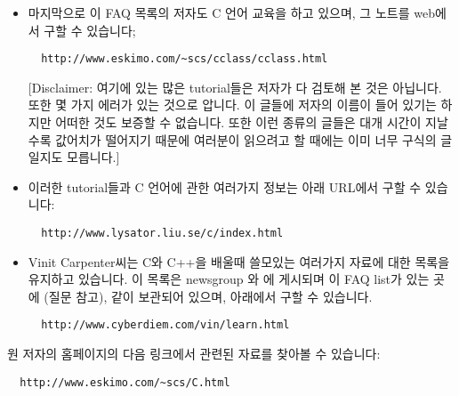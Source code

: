 \begin{faq}
\begin{itemize}
	\item 마지막으로 이 FAQ 목록의 저자도 C 언어 교육을 하고 있으며,
	그 노트를 web에서 구할 수 있습니다;
\begin{verbatim}
  http://www.eskimo.com/~scs/cclass/cclass.html
\end{verbatim}

	[Disclaimer: 여기에 있는 많은 tutorial들은 저자가 다 검토해 본 것은
	아닙니다.  또한 몇 가지 에러가 있는 것으로 압니다.  이 글들에 저자의
	이름이 들어 있기는 하지만 어떠한 것도 보증할 수 없습니다.
	또한 이런 종류의 글들은 대개 시간이 지날 수록 값어치가 떨어지기
	때문에 여러분이 읽으려고 할 때에는 이미 너무 구식의 글일지도
	모릅니다.]

	\item 이러한 tutorial들과 C 언어에 관한 여러가지 정보는
	아래 URL에서 구할 수 있습니다:
\begin{verbatim}
  http://www.lysator.liu.se/c/index.html
\end{verbatim}

	\item Vinit Carpenter씨는 C와 C++을 배울때 쓸모있는 여러가지 자료에
	대한 목록을 유지하고 있습니다.  이 목록은 newsgroup 와
 	에 게시되며 이 FAQ list가 있는 곳에 (질문 
	참고), 같이 보관되어 있으며, 아래에서 구할 수 있습니다.
\begin{verbatim}
  http://www.cyberdiem.com/vin/learn.html
\end{verbatim}
	\end{itemize}


\T
	원 저자의 홈페이지의 다음 링크에서 관련된 자료를 찾아볼 수 있습니다:
\begin{verbatim}
  http://www.eskimo.com/~scs/C.html
\end{verbatim}


\end{faq}

